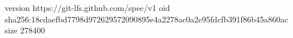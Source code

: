version https://git-lfs.github.com/spec/v1
oid sha256:18cdaefbd7798d972629572090895e4a2278ac0a2e95fdcfb391f86b45a860ac
size 278400
